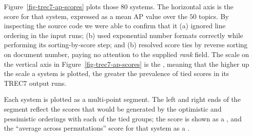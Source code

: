 Figure~\ref{fig-trec7-ap-scores} plots those $80$ systems.
The horizontal axis is the {\treceval} score for that system,
expressed as a mean AP value over the $50$ topics.
By inspecting the {\treceval} source code we were able to confirm
that it (a) ignored line ordering in the input runs; (b) used
exponential number formats correctly while performing its
sorting-by-score step; and (b) resolved score ties by reverse sorting
on document number, paying no attention to the supplied {\emph{rank}}
field.
The scale on the vertical axis in Figure~\ref{fig-trec7-ap-scores} is
the {}, meaning that the higher up the scale a
system is plotted, the greater the prevalence of tied scores in its
TREC7 output runs.

Each system is plotted as a multi-point segment.
The left and right ends of the segment reflect the scores that would
be generated by the optimistic and pessimistic orderings with each of
the tied groups; the {\treceval} score is shown as a
{}, and the ``average across permutations'' score
for that system as a {}.
{}



{}
{}
